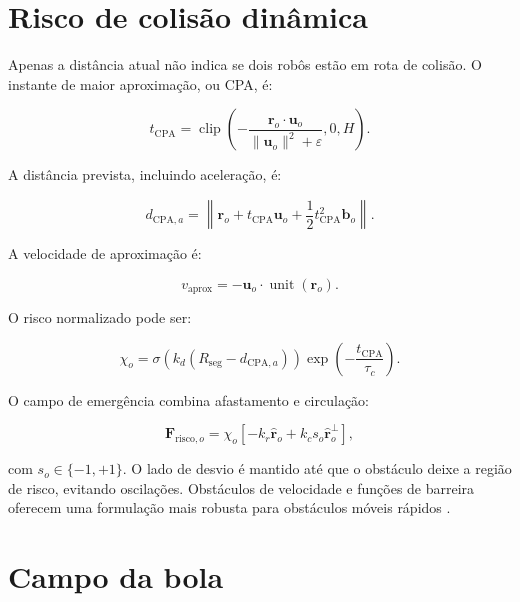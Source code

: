 \documentclass[12pt,a4paper]{article}
\newcommand{\vect}[1]{\boldsymbol{#1}}
\newcommand{\unit}[1]{\widehat{\vect{#1}}}
\DeclareMathOperator{\clip}{clip}
\begin{document}
\section{Risco de colis\~ao din\^amica}

Apenas a dist\^ancia atual n\~ao indica se dois rob\^os est\~ao em rota de colis\~ao. O instante de maior aproxima\c{c}\~ao, ou CPA, \'e:

\begin{equation}
  t_{\mathrm{CPA}}=\clip\left(-\frac{\vect{r}_o\cdot\vect{u}_o}{\|\vect{u}_o\|^2+\varepsilon},0,H\right).
\end{equation}

A dist\^ancia prevista, incluindo acelera\c{c}\~ao, \'e:

\begin{equation}
  d_{\mathrm{CPA},a}=\left\|\vect{r}_o+t_{\mathrm{CPA}}\vect{u}_o+\frac{1}{2}t_{\mathrm{CPA}}^2\vect{b}_o\right\|.
\end{equation}

A velocidade de aproxima\c{c}\~ao \'e:

\begin{equation}
  v_{\mathrm{aprox}}=-\vect{u}_o\cdot\operatorname{unit}(\vect{r}_o).
\end{equation}

O risco normalizado pode ser:

\begin{equation}
  \chi_o=\sigma(k_d(R_{\mathrm{seg}}-d_{\mathrm{CPA},a}))
  \exp\left(-\frac{t_{\mathrm{CPA}}}{\tau_c}\right).
\end{equation}

O campo de emerg\^encia combina afastamento e circula\c{c}\~ao:

\begin{equation}
  \vect{F}_{\mathrm{risco},o}=\chi_o\left[-k_r\unit{r}_o+k_cs_o\unit{r}_o^\perp\right],
\end{equation}

com $s_o\in\{-1,+1\}$. O lado de desvio \'e mantido at\'e que o obst\'aculo deixe a regi\~ao de risco, evitando oscila\c{c}\~oes. Obst\'aculos de velocidade e fun\c{c}\~oes de barreira oferecem uma formula\c{c}\~ao mais robusta para obst\'aculos m\'oveis r\'apidos \cite{huang2025}.

\section{Campo da bola}
\end{document}
